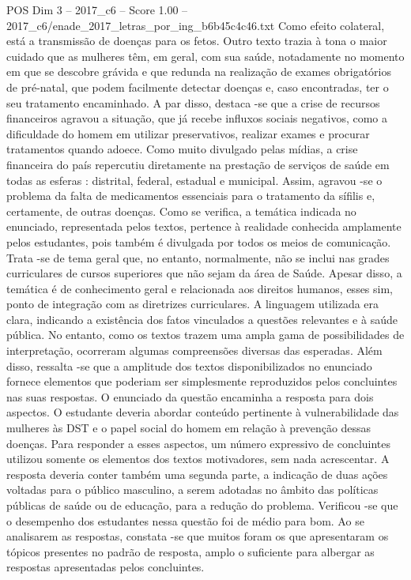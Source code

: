 \begin{textsample}{POS Dim 3 – 2017\_c6 – Score 1.00 – 2017\_c6/enade\_2017\_letras\_por\_ing\_b6b45c4c46.txt}
Como efeito colateral, está a transmissão de doenças para os fetos.
Outro texto trazia à tona o maior cuidado que as mulheres têm, em geral, com sua saúde, notadamente no momento em que se descobre grávida e que redunda na realização de exames obrigatórios de pré-natal, que podem facilmente detectar doenças e, caso encontradas, ter o seu tratamento encaminhado.
A par disso, destaca -se que a crise de recursos financeiros agravou a situação, que já recebe influxos sociais negativos, como a dificuldade do homem em utilizar preservativos, realizar exames e procurar tratamentos quando adoece.
Como muito divulgado pelas mídias, a crise financeira do país repercutiu diretamente na prestação de serviços de saúde em todas as esferas : distrital, federal, estadual e municipal.
Assim, agravou -se o problema da falta de medicamentos essenciais para o tratamento da sífilis e, certamente, de outras doenças.
Como se verifica, a temática indicada no enunciado, representada pelos textos, pertence à realidade conhecida amplamente pelos estudantes, pois também é divulgada por todos os meios de comunicação.
Trata -se de tema geral que, no entanto, normalmente, não se inclui nas grades curriculares de cursos superiores que não sejam da área de Saúde.
Apesar disso, a temática é de conhecimento geral e relacionada aos direitos humanos, esses sim, ponto de integração com as diretrizes curriculares.
A linguagem utilizada era clara, indicando a existência dos fatos vinculados a questões relevantes e à saúde pública.
No entanto, como os textos trazem uma ampla gama de possibilidades de interpretação, ocorreram algumas compreensões diversas das esperadas.
Além disso, ressalta -se que a amplitude dos textos disponibilizados no enunciado fornece elementos que poderiam ser simplesmente reproduzidos pelos concluintes nas suas respostas.
O enunciado da questão encaminha a resposta para dois aspectos.
O estudante deveria abordar conteúdo pertinente à vulnerabilidade das mulheres às DST e o papel social do homem em relação à prevenção dessas doenças.
Para responder a esses aspectos, um número expressivo de concluintes utilizou somente os elementos dos textos motivadores, sem nada acrescentar.
A resposta deveria conter também uma segunda parte, a indicação de duas ações voltadas para o público masculino, a serem adotadas no âmbito das políticas públicas de saúde ou de educação, para a redução do problema.
Verificou -se que o desempenho dos estudantes nessa questão foi de médio para bom.
Ao se analisarem as respostas, constata -se que muitos foram os que apresentaram os tópicos presentes no padrão de resposta, amplo o suficiente para albergar as respostas apresentadas pelos concluintes.

\end{textsample}
